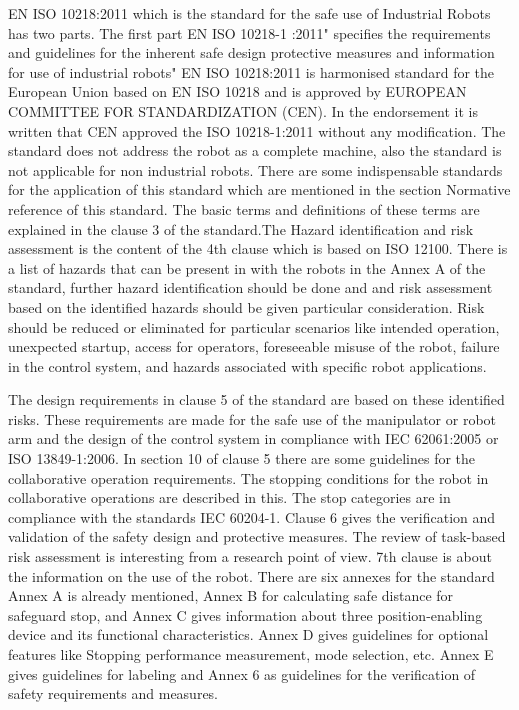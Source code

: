 {EN ISO 10218:2011 which is the standard for the safe use of Industrial Robots has two parts. The first part EN ISO 10218-1 :2011" specifies the requirements and guidelines for the inherent safe design protective measures and information for use of industrial robots"\cite{author2} EN ISO 10218:2011 is harmonised standard for the European Union based on EN ISO 10218 and is approved by EUROPEAN COMMITTEE FOR STANDARDIZATION (CEN). In the endorsement it is written that CEN approved the ISO 10218-1:2011 without any modification. The standard does not address the robot as a complete machine, also the standard is not applicable for non industrial robots. There are some indispensable standards for the application of this standard which are mentioned in the section Normative reference of this standard. The basic terms and definitions of these terms are explained in the clause 3 of the standard.The Hazard identification and risk assessment is the content of the 4th clause which is based on ISO 12100. There is a list of hazards that can be present in with the robots in the Annex A of the standard, further hazard identification should be done and and risk assessment based on the identified hazards should be given particular consideration. Risk should be reduced or eliminated for particular scenarios like intended operation, unexpected startup, access for operators, foreseeable misuse of the robot, failure in the control system, and hazards associated with specific robot applications. 
 
 The design requirements in clause 5 of the standard are based on these identified risks. These requirements are made for the safe use of the manipulator or robot arm and the design of the control system in compliance with IEC 62061:2005 or ISO 13849-1:2006. In section 10 of clause 5 there are some guidelines for the collaborative operation requirements. The stopping conditions for the robot in collaborative operations are described in this.  The stop categories are in compliance with the standards IEC 60204-1. Clause 6 gives the verification and validation of the safety design and protective measures. The review of task-based risk assessment is interesting from a research point of view. 7th clause is about the information on the use of the robot. There are six annexes for the standard Annex A is already mentioned, Annex B for calculating safe distance for safeguard stop, and Annex C gives information about three position-enabling device and its functional characteristics. Annex D gives guidelines for optional features like Stopping performance measurement, mode selection, etc. Annex E gives guidelines for labeling and Annex 6 as guidelines for the verification of safety requirements and measures.

}
